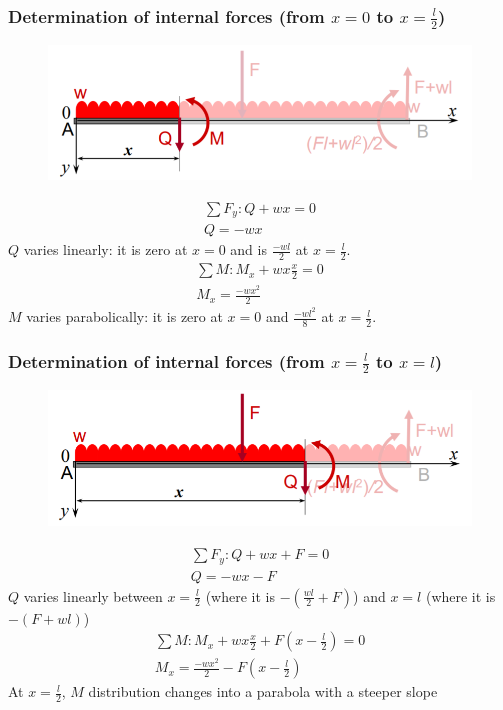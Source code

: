 \documentclass[class=report, crop=false, 12pt,a4paper]{standalone}
\begin{document}
\subsubsection{Determination of internal forces (from $x=0$ to $x=\frac{l}{2}$)}
\begin{figure}[H]
  \centering
  \includegraphics[width = 0.8 \textwidth]{../img/determinationofforces1.PNG}
\end{figure}
\begin{gather}
  \sum F_y: Q + wx = 0 \\
  Q = -wx
\end{gather}
$Q$ varies linearly: it is zero at $x=0$ and is $\frac{-wl}{2}$ at $x=\frac{l}{2}$.
\begin{gather}
  \sum M: M_x + wx\frac{x}{2} = 0 \\
  M_x = \frac{-wx^2}{2}
\end{gather}
$M$ varies parabolically: it is zero at $x=0$ and $\frac{-wl^2}{8}$ at $x=\frac{l}{2}$.
\subsubsection{Determination of internal forces (from $x=\frac{l}{2}$ to $x=l$)}
\begin{figure}[H]
  \centering
  \includegraphics[width = 0.8 \textwidth]{../img/determinationofforces2.PNG}
\end{figure}
\begin{gather}
  \sum F_y: Q + wx + F = 0 \\
  Q = -wx -F
\end{gather}
$Q$ varies linearly between $x=\frac{l}{2}$ (where it is $-(\frac{wl}{2}+F)$) and $x=l$ (where it is $-(F+wl)$)
\begin{gather}
  \sum M: M_x + wx\frac{x}{2} + F(x-\frac{l}{2})= 0 \\
  M_x = \frac{-wx^2}{2} - F(x-\frac{l}{2})
\end{gather}
At $x=\frac{l}{2}$, $M$ distribution changes into a parabola with a steeper slope
\end{document}
